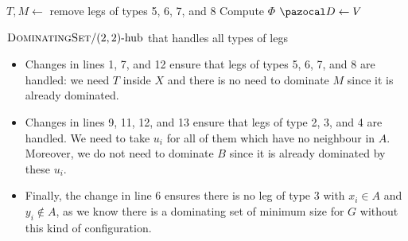 \begin{algorithm}
    {\color{red}$T, M \gets$ remove legs of types 5, 6, 7, and 8\;}
    Compute $\Phi$\;
    $\D \gets V$\;
    \caption{$\prob{DominatingSet}/\sdhub[2,2]$ that handles all types of legs}
    \label{algo:domset-22-2}
\end{algorithm}

\begin{itemize}
    \item Changes in lines 1, 7, and 12 ensure that legs of types 5, 6, 7, and 8 are handled: we need $T$ inside $X$ and there is no need to dominate $M$ since it is already dominated.

    \item Changes in lines 9, 11, 12, and 13 ensure that legs of type 2, 3, and 4 are handled. We need to take $u_i$ for all of them which have no neighbour in $A$. Moreover, we do not need to dominate $B$ since it is already dominated by these $u_i$.
    
    \item Finally, the change in line 6 ensures there is no leg of type 3 with $x_i \in A$ and $y_i \notin A$, as we know there is a dominating set of minimum size for $G$ without this kind of configuration.
\end{itemize}
